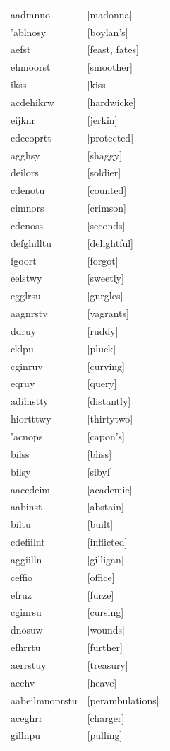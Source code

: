 \documentclass{article}
\begin{document}
\begin{tabular}{ll}
aadmnno & [madonna] \\
'ablnosy & [boylan's] \\
aefst & [feast, fates] \\
ehmoorst & [smoother] \\
ikss & [kiss] \\
acdehikrw & [hardwicke] \\
eijknr & [jerkin] \\
cdeeoprtt & [protected] \\
agghsy & [shaggy] \\
deilors & [soldier] \\
cdenotu & [counted] \\
cimnors & [crimson] \\
cdenoss & [seconds] \\
defghilltu & [delightful] \\
fgoort & [forgot] \\
eelstwy & [sweetly] \\
egglrsu & [gurgles] \\
aagnrstv & [vagrants] \\
ddruy & [ruddy] \\
cklpu & [pluck] \\
cginruv & [curving] \\
eqruy & [query] \\
adilnstty & [distantly] \\
hiortttwy & [thirtytwo] \\
'acnops & [capon's] \\
bilss & [bliss] \\
bilsy & [sibyl] \\
aaccdeim & [academic] \\
aabinst & [abstain] \\
biltu & [built] \\
cdefiilnt & [inflicted] \\
aggiilln & [gilligan] \\
ceffio & [office] \\
efruz & [furze] \\
cginrsu & [cursing] \\
dnosuw & [wounds] \\
efhrrtu & [further] \\
aerrstuy & [treasury] \\
aeehv & [heave] \\
aabeilmnoprstu & [perambulations] \\
aceghrr & [charger] \\
gillnpu & [pulling] \\

\end{tabular}
\end{document}
